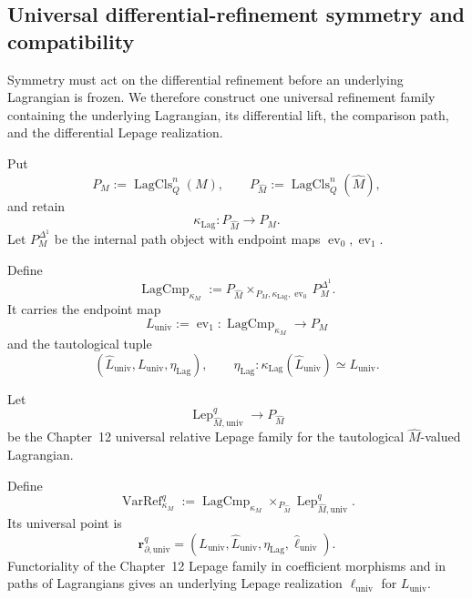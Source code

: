 \subsection{Universal differential-refinement symmetry and compatibility}
\label{subsec:prequantum-differential-symmetry-compatibility}

Symmetry must act on the differential refinement before an underlying
Lagrangian is frozen.  We therefore construct one universal refinement family
containing the underlying Lagrangian, its differential lift, the comparison path,
and the differential Lepage realization.

Put
\[
P_M:=\operatorname{LagCls}_Q^n(M),
\qquad
P_{\widehat M}:=\operatorname{LagCls}_Q^n(\widehat M),
\]
and retain
\[
\kappa_{\mathrm{Lag}}:P_{\widehat M}\longrightarrow P_M.
\]
Let $P_M^{\Delta^1}$ be the internal path object with endpoint maps
$\operatorname{ev}_0,\operatorname{ev}_1$.

\begin{definition}
\label{def:prequantum-universal-lagrangian-comparison-object}
Define
\[
\boxed{
\operatorname{LagCmp}_{\kappa_M}
:=
P_{\widehat M}
\times_{P_M,\kappa_{\mathrm{Lag}},\operatorname{ev}_0}
P_M^{\Delta^1}.
}
\]
It carries the endpoint map
\[
L_{\mathrm{univ}}:=\operatorname{ev}_1:
\operatorname{LagCmp}_{\kappa_M}\longrightarrow P_M
\]
and the tautological tuple
\[
(\widehat L_{\mathrm{univ}},L_{\mathrm{univ}},
  \eta_{\mathrm{Lag}}),
\qquad
\eta_{\mathrm{Lag}}:
\kappa_{\mathrm{Lag}}(\widehat L_{\mathrm{univ}})
\simeq L_{\mathrm{univ}}.
\]
\end{definition}

Let
\[
\operatorname{Lep}_{\widehat M,\mathrm{univ}}^q
\longrightarrow P_{\widehat M}
\]
be the Chapter~12 universal relative Lepage family for the tautological
$\widehat M$-valued Lagrangian.

\begin{definition}
\label{def:prequantum-universal-differential-variational-refinement}
Define
\[
\boxed{
\operatorname{VarRef}_{\kappa_M}^q
:=
\operatorname{LagCmp}_{\kappa_M}
\times_{P_{\widehat M}}
\operatorname{Lep}_{\widehat M,\mathrm{univ}}^q.
}
\]
Its universal point is
\[
\mathbf r_{\partial,\mathrm{univ}}^q
=
(L_{\mathrm{univ}},\widehat L_{\mathrm{univ}},
 \eta_{\mathrm{Lag}},\widehat\ell_{\mathrm{univ}}).
\]
Functoriality of the Chapter~12 Lepage family in coefficient morphisms and in
paths of Lagrangians gives an underlying Lepage realization
$\ell_{\mathrm{univ}}$ for $L_{\mathrm{univ}}$.
\end{definition}

